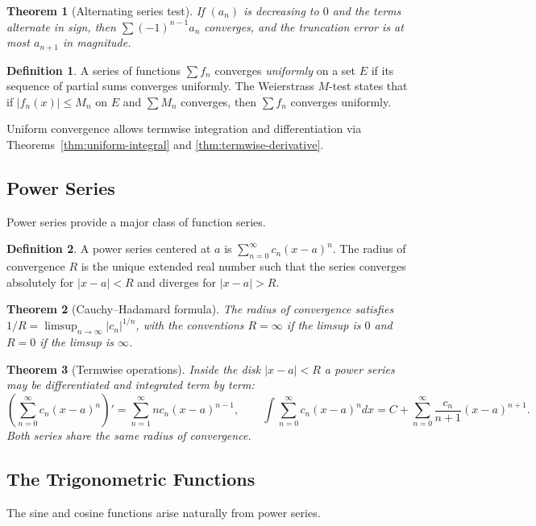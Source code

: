 \documentclass{article}
\theoremstyle{definition}
\newtheorem{definition}{Definition}[section]
\theoremstyle{plain}
\newtheorem{theorem}{Theorem}[section]
\begin{document}
\begin{theorem}[Alternating series test]
	If $(a_n)$ is decreasing to $0$ and the terms alternate in sign, then $\sum (-1)^{n-1}a_n$ converges, and the truncation error is at most $a_{n+1}$ in magnitude.
\end{theorem}

\begin{definition}\label{def:series-uniform}
	A series of functions $\sum f_n$ converges \emph{uniformly} on a set $E$ if its sequence of partial sums converges uniformly. The Weierstrass $M$-test states that if $|f_n(x)|\le M_n$ on $E$ and $\sum M_n$ converges, then $\sum f_n$ converges uniformly.
\end{definition}

Uniform convergence allows termwise integration and differentiation via Theorems~\ref{thm:uniform-integral} and \ref{thm:termwise-derivative}.

\subsection{Power Series}\label{subsec:power-series}
Power series provide a major class of function series.

\begin{definition}
	A power series centered at $a$ is $\sum_{n=0}^\infty c_n (x-a)^n$. The radius of convergence $R$ is the unique extended real number such that the series converges absolutely for $|x-a|<R$ and diverges for $|x-a|>R$.
\end{definition}

\begin{theorem}[Cauchy–Hadamard formula]
	The radius of convergence satisfies $1/R = \limsup_{n\to\infty} |c_n|^{1/n}$, with the conventions $R=\infty$ if the limsup is $0$ and $R=0$ if the limsup is $\infty$.
\end{theorem}

\begin{theorem}[Termwise operations]
	Inside the disk $|x-a|<R$ a power series may be differentiated and integrated term by term:
	\[
		\left(\sum_{n=0}^\infty c_n (x-a)^n\right)' = \sum_{n=1}^\infty n c_n (x-a)^{n-1}, \qquad \int \sum_{n=0}^\infty c_n (x-a)^n dx = C + \sum_{n=0}^\infty \frac{c_n}{n+1}(x-a)^{n+1}.
	\]
	Both series share the same radius of convergence.
\end{theorem}

\subsection{The Trigonometric Functions}\label{subsec:trig-functions}
The sine and cosine functions arise naturally from power series.
\end{document}
